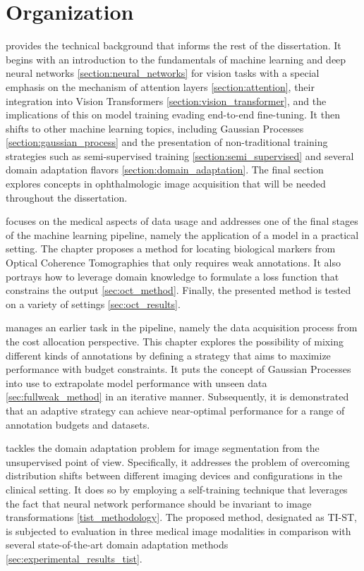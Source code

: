 \section{Organization}
 provides the technical background that informs the rest of the dissertation. It begins with an introduction to the fundamentals of machine learning and deep neural networks \cref{section:neural_networks} for vision tasks with a special emphasis on the mechanism of attention layers \cref{section:attention}, their integration into Vision Transformers \cref{section:vision_transformer}, and the implications of this on model training evading end-to-end fine-tuning. It then shifts to other machine learning topics, including Gaussian Processes \cref{section:gaussian_process} and the presentation of non-traditional training strategies such as semi-supervised training \cref{section:semi_supervised} and several domain adaptation flavors \cref{section:domain_adaptation}. The final section explores concepts in ophthalmologic image acquisition that will be needed throughout the dissertation.

 focuses on the medical aspects of data usage and addresses one of the final stages of the machine learning pipeline, namely the application of a model in a practical setting. The chapter proposes a method for locating biological markers from Optical Coherence Tomographies that only requires weak annotations. It also portrays how to leverage domain knowledge to formulate a loss function that constrains the output \cref{sec:oct_method}. Finally, the presented method is tested on a variety of settings \cref{sec:oct_results}.

 manages an earlier task in the pipeline, namely the data acquisition process from the cost allocation perspective. This chapter explores the possibility of mixing different kinds of annotations by defining a strategy that aims to maximize performance with budget constraints. It puts the concept of Gaussian Processes into use to extrapolate model performance with unseen data \cref{sec:fullweak_method} in an iterative manner. Subsequently, it is demonstrated that an adaptive strategy can achieve near-optimal performance for a range of annotation budgets and datasets.

 tackles the domain adaptation problem for image segmentation from the unsupervised point of view. Specifically, it addresses the problem of overcoming distribution shifts between different imaging devices and configurations in the clinical setting. It does so by employing a self-training technique that leverages the fact that neural network performance should be invariant to image transformations \cref{tist_methodology}. The proposed method, designated as TI-ST, is subjected to evaluation in three medical image modalities in comparison with several state-of-the-art domain adaptation methods \cref{sec:experimental_results_tist}.

